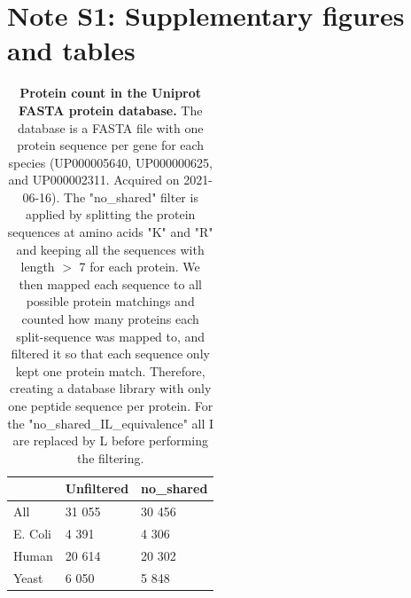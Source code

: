 \documentclass[11pt]{article}
\begin{document}
\maketitle

\section*{Note S1: Supplementary figures and tables}
\label{sec:fc-eval}


\begin{table}[hbt]
\centering
\begin{tabular}{lll}
\hline
        & Unfiltered & no\_shared \\ \hline
All     & 31 055     & 30 456     \\
E. Coli & 4 391      & 4 306      \\
Human   & 20 614     & 20 302     \\
Yeast   & 6 050      & 5 848      \\ \hline
\end{tabular}

  \caption{{\bf Protein count in the Uniprot FASTA protein database.} The database is a FASTA file with one protein sequence per gene for each species (UP000005640, UP000000625, and UP000002311. Acquired on 2021-06-16). The "no\_shared" filter is applied by splitting the protein sequences at amino acids "K" and "R" and keeping all the sequences with length $>$ 7 for each protein. We then mapped each sequence to all possible protein matchings and counted how many proteins each split-sequence was mapped to, and filtered it so that each sequence only kept one protein match. Therefore, creating a database library with only one peptide sequence per protein. For the "no\_shared\_IL\_equivalence" all I are replaced by L before performing the filtering. \label{table:proteins_in_database}}

\end{table}
\end{document}

